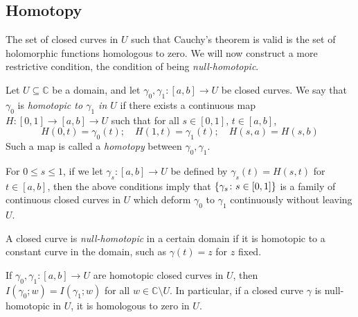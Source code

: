 \subsection{Homotopy}
The set of closed curves in \( U \) such that Cauchy's theorem is valid is the set of holomorphic functions homologous to zero.
We will now construct a more restrictive condition, the condition of being \textit{null-homotopic}.
\begin{definition}
	Let \( U \subseteq \mathbb C \) be a domain, and let \( \gamma_0, \gamma_1 \colon [a,b] \to U \) be closed curves.
	We say that \( \gamma_0 \) is \textit{homotopic to \( \gamma_1 \) in \( U \)} if there exists a continuous map \( H \colon [0,1] \to [a,b] \to U \) such that for all \( s \in [0,1] \), \( t \in [a,b] \),
	\[ H(0,t) = \gamma_0(t);\quad H(1,t) = \gamma_1(t);\quad H(s,a) = H(s,b) \]
	Such a map is called a \textit{homotopy} between \( \gamma_0, \gamma_1 \).
\end{definition}
For \( 0 \leq s \leq 1 \), if we let \( \gamma_s\colon [a,b] \to U \) be defined by \( \gamma_s(t) = H(s,t) \) for \( t \in [a,b] \), then the above conditions imply that \( \qty{\gamma_s \colon s \in [0,1]} \) is a family of continuous closed curves in \( U \) which deform \( \gamma_0 \) to \( \gamma_1 \) continuously without leaving \( U \).
\begin{definition}
	A closed curve is \textit{null-homotopic} in a certain domain if it is homotopic to a constant curve in the domain, such as \( \gamma(t) = z \) for \( z \) fixed.
\end{definition}
\begin{theorem}
	If \( \gamma_0, \gamma_1 \colon [a,b] \to U \) are homotopic closed curves in \( U \), then \( I(\gamma_0; w) = I(\gamma_1;w) \) for all \( w \in \mathbb C \setminus U \).
	In particular, if a closed curve \( \gamma \) is null-homotopic in \( U \), it is homologous to zero in \( U \).
\end{theorem}
